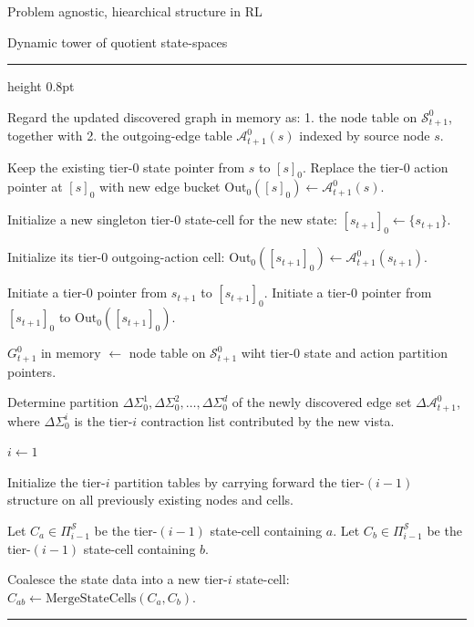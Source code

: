 \documentclass[11pt]{article}
\newenvironment{breakablealgorithm}
    {%
    \begin{center}
    \refstepcounter{algorithm}
    \hrule height 0.8pt\kern 2pt
    \renewcommand{\caption}[2][\relax]{%
        {\raggedright\textbf{Algorithm \thealgorithm: ##2}\par}
        \ifx\relax##1\relax
            \addcontentsline{loa}{algorithm}{\protect\numberline{\thealgorithm}##2}%
        \else
            \addcontentsline{loa}{algorithm}{\protect\numberline{\thealgorithm}##1}%
            \fi
        \kern 2pt\hrule\kern 2pt }
    }{%
    \kern 2pt\hrule \end{center}
    }
\begin{document}
\begin{section}{Problem agnostic, hiearchical structure in RL}
\begin{subsection}{Dynamic tower of quotient state-spaces}
\begin{breakablealgorithm}
\begin{algorithmic}[1]
    \State Regard the updated discovered graph in memory as:
    1. the node table on $\mathcal{S}_{t+1}^0$, together with
    2. the outgoing-edge table $\mathcal{A}_{t+1}^0(s)$ indexed by source node $s$.


        \State Keep the existing tier-$0$ state pointer from $s$ to $[s]_0$.
        \State Replace the tier-$0$ action pointer at $[s]_0$ with new edge bucket
        $
        \mathrm{Out}_0([s]_0)\gets \mathcal{A}_{t+1}^0(s).
        $
    \EndFor

    \State Initialize a new singleton tier-$0$ state-cell for the new state:
    $
    [s_{t+1}]_0\gets \{s_{t+1}\}.
    $

    \State Initialize its tier-$0$ outgoing-action cell:
    $
    \mathrm{Out}_0([s_{t+1}]_0)\gets \mathcal{A}_{t+1}^0(s_{t+1}).
    $

    \State Initiate a tier-$0$ pointer from $s_{t+1}$ to $[s_{t+1}]_0$.
    \State Initiate a tier-$0$ pointer from $[s_{t+1}]_0$ to $\mathrm{Out}_0([s_{t+1}]_0)$.

    \State $G_{t+1}^0$ in memory $\gets$ node table on $\mathcal{S}_{t+1}^0$ wiht tier-$0$ state and action partition pointers.

    \State Determine partition
    $
    \Delta\Sigma_0^1,\Delta\Sigma_0^2,\dots,\Delta\Sigma_0^d
    $
    of the newly discovered edge set $\Delta\mathcal{A}_{t+1}^0$, where $\Delta\Sigma_0^i$ is the tier-$i$ contraction list contributed by the new vista.


    \State $i \gets 1$

        \State Initialize the tier-$i$ partition tables by carrying forward the tier-$(i-1)$ structure on all previously existing nodes and cells.

            \State Let $C_a\in\Pi_{i-1}^{\mathcal S}$ be the tier-$(i-1)$ state-cell containing $a$.
            \State Let $C_b\in\Pi_{i-1}^{\mathcal S}$ be the tier-$(i-1)$ state-cell containing $b$.

                \State Coalesce the state data into a new tier-$i$ state-cell:
                $
                C_{ab}\gets \mathrm{MergeStateCells}(C_a,C_b).
                $


\end{algorithmic}
\end{breakablealgorithm}
\end{subsection}
\end{section}
\end{document}
